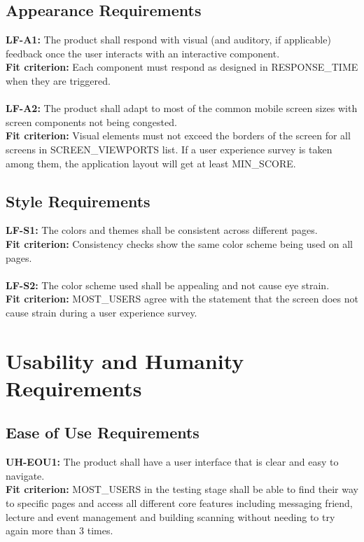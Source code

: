 \documentclass[12pt]{article}
\begin{document}
\subsection{Appearance Requirements}
  \textbf{LF-A1:} The product shall respond with visual (and auditory, if applicable) feedback once the user interacts with an interactive component.\\
  \textbf{Fit criterion:} Each component must respond as designed in RESPONSE\_TIME when they are triggered.\\\\
  \textbf{LF-A2:} The product shall adapt to most of the common mobile screen sizes with screen components not being congested.\\
  \textbf{Fit criterion:} Visual elements must not exceed the borders of the screen for all screens in SCREEN\_VIEWPORTS list. If a user experience survey is taken among them, the application layout will get at least MIN\_SCORE.\\
\subsection{Style Requirements}
  \textbf{LF-S1:} The colors and themes shall be consistent across different pages.\\
  \textbf{Fit criterion:} Consistency checks show the same color scheme being used on all pages.\\\\
  \textbf{LF-S2:} The color scheme used shall be appealing and not cause eye strain.\\
  \textbf{Fit criterion:} MOST\_USERS agree with the statement that the screen does not cause strain during a user experience survey.\\

\section{Usability and Humanity Requirements}
\subsection{Ease of Use Requirements}
  \textbf{UH-EOU1:} The product shall have a user interface that is clear and easy to navigate.\\
  \textbf{Fit criterion:} MOST\_USERS in the testing stage shall be able to find their way to specific pages and access all different core features including messaging friend, lecture and event management and building scanning without needing to try again more than 3 times.\\
\end{document}
